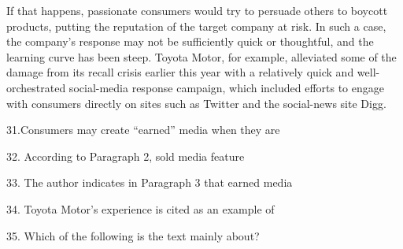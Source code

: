 \qquad If that happens, passionate consumers would try to persuade others to boycott products, putting the reputation of the target company at risk. In such a case, the company's response may not be sufficiently quick or thoughtful, and the learning curve has been steep. Toyota Motor, for example, alleviated some of the damage from its recall crisis earlier this year with a relatively quick and well-orchestrated social-media response campaign, which included efforts to engage with consumers directly on sites such as Twitter and the social-news site Digg.

\vspace{6pt}

31.Consumers may create ``earned'' media when they are\par

32. According to Paragraph 2, sold media feature\par

33. The author indicates in Paragraph 3 that earned media\par

34. Toyota Motor's experience is cited as an example of\par

35. Which of the following is the text mainly about?\par
